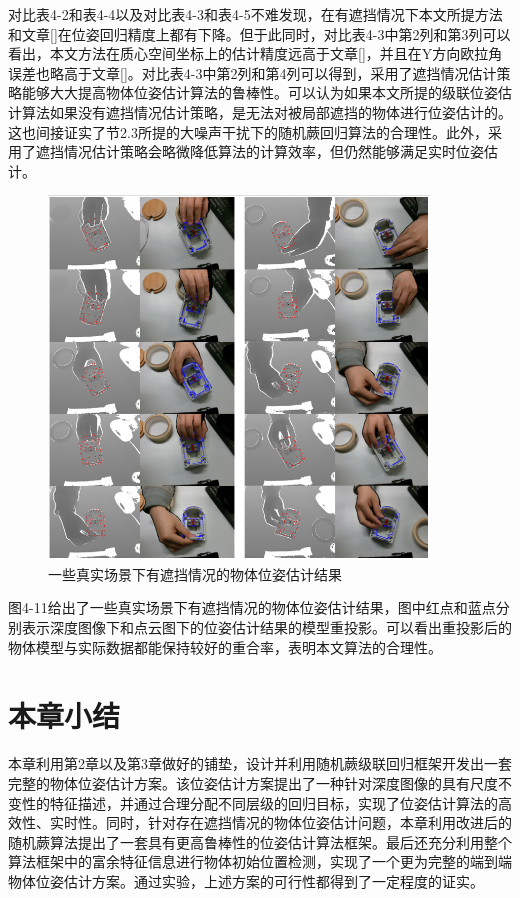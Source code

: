 对比表4-2和表4-4以及对比表4-3和表4-5不难发现，在有遮挡情况下本文所提方法和文章[]在位姿回归精度上都有下降。但于此同时，对比表4-3中第2列和第3列可以看出，本文方法在质心空间坐标上的估计精度远高于文章[]，并且在Y方向欧拉角误差也略高于文章[]。对比表4-3中第2列和第4列可以得到，采用了遮挡情况估计策略能够大大提高物体位姿估计算法的鲁棒性。可以认为如果本文所提的级联位姿估计算法如果没有遮挡情况估计策略，是无法对被局部遮挡的物体进行位姿估计的。这也间接证实了节2.3所提的大噪声干扰下的随机蕨回归算法的合理性。此外，采用了遮挡情况估计策略会略微降低算法的计算效率，但仍然能够满足实时位姿估计。

\begin{figure}[htb]
	\centering 
	\includegraphics[width=0.9\textwidth]{./mypic/71.png} 
	\caption{一些真实场景下有遮挡情况的物体位姿估计结果} 
\end{figure}

图4-11给出了一些真实场景下有遮挡情况的物体位姿估计结果，图中红点和蓝点分别表示深度图像下和点云图下的位姿估计结果的模型重投影。可以看出重投影后的物体模型与实际数据都能保持较好的重合率，表明本文算法的合理性。



\section{本章小结}

本章利用第2章以及第3章做好的铺垫，设计并利用随机蕨级联回归框架开发出一套完整的物体位姿估计方案。该位姿估计方案提出了一种针对深度图像的具有尺度不变性的特征描述，并通过合理分配不同层级的回归目标，实现了位姿估计算法的高效性、实时性。同时，针对存在遮挡情况的物体位姿估计问题，本章利用改进后的随机蕨算法提出了一套具有更高鲁棒性的位姿估计算法框架。最后还充分利用整个算法框架中的富余特征信息进行物体初始位置检测，实现了一个更为完整的端到端物体位姿估计方案。通过实验，上述方案的可行性都得到了一定程度的证实。













